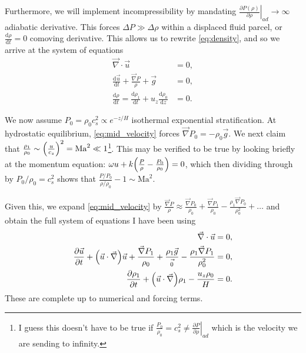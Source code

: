 \documentclass[11pt,
        usenames, %
        dvipsnames %
    ]{article}
\newcommand*{\rd}[2]{\frac{\mathrm{d}#1}{\mathrm{d}#2}}
\newcommand*{\pd}[2]{\frac{\partial#1}{\partial#2}}
\newcommand*{\at}[1]{\left.#1\right|}
\DeclarePairedDelimiter\p{\lparen}{\rparen}
\begin{document}
Furthermore, we will implement incompressibility by mandating
$\at{\pd{P(\rho)}{\rho}}_{ad} \to \infty$ adiabatic derivative. This forces
$\Delta P \gg \Delta \rho$ within a displaced fluid parcel, or $\rd{\rho}{t} =
0$ comoving derivative. This allows us to rewrite \autoref{eq:density}, and so
we arrive at the system of equations
\begin{subequations}\label{se:pseudo_mid}
    \begin{align}
        \vec{\nabla} \cdot \vec{u} &= 0, \label{eq:mid_density}\\
        \rd{\vec{u}}{t} + \frac{\vec{\nabla}P}{\rho} + \vec{g} &= 0,
            \label{eq:mid_velocity}\\
        \rd{\rho}{t} = \rd{\rho_1}{t} + u_z \rd{\rho_0}{z} &= 0.
            \label{eq:mid_eos}
    \end{align}
\end{subequations}

We now assume $P_0 = \rho_0 c_s^2 \propto e^{-z/H}$ isothermal exponential
stratification. At hydrostatic equilibrium, \autoref{eq:mid_velocity} forces
$\vec{\nabla}P_0 = -\rho_0 \vec{g}$. We next claim that $\frac{\rho_1}{\rho_0}
\sim \p*{\frac{u}{c_s}}^2 = \mathrm{Ma}^2 \ll 1$\footnote{I guess this doesn't
have to be true if $\frac{P_0}{\rho_0} = c_s^2 \neq \at{\pd{P}{\rho}}_{ad}$
which is the velocity we are sending to infinity.}. This may be verified to be
true by looking briefly at the momentum equation: $\omega u +
k\p*{\frac{P}{\rho} - \frac{P_0}{\rho_0}} = 0$, which then dividing through by
$P_0 / \rho_0 = c_s^2$ shows that $\frac{P/P_0}{\rho/\rho_0} - 1 \sim
\mathrm{Ma}^2$.

Given this, we expand \autoref{eq:mid_velocity} by $\frac{\vec{\nabla}P}{\rho}
\approx \frac{\vec{\nabla}P_0}{\rho_0} + \frac{\vec{\nabla}P_1}{\rho_0} -
\frac{\rho_1 \vec{\nabla}P_0}{\rho_0^2} + \dots$ and obtain the full system of
equations I have been using
\begin{subequations}\label{se:pseudo_fin}
    \begin{align}
        \vec{\nabla} \cdot \vec{u} &= 0, \label{eq:pseudo_density}\\
        \pd{\vec{u}}{t} + \p*{\vec{u} \cdot \vec{\nabla}}\vec{u}
            + \frac{\vec{\nabla}P_1}{\rho_0}
            + \frac{\rho_1 \vec{g}}{\vec{_0}} - \frac{\rho_1 \vec{\nabla}P_1}{
                \rho_0^2} &= 0,
            \label{eq:pseudo_velocity}\\
        \pd{\rho_1}{t} + \p*{\vec{u} \cdot \vec{\nabla}}\rho_1
            - \frac{u_z \rho_0}{H} &= 0.
            \label{eq:pseudo_eos}
    \end{align}
\end{subequations}
These are complete up to numerical and forcing terms.
\end{document}
